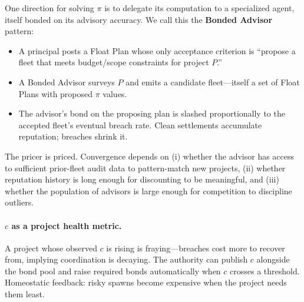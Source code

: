 \documentclass[11pt,a4paper]{article}
\theoremstyle{definition}
\theoremstyle{remark}
\begin{document}
One direction for solving $\pi$ is to delegate its computation to a specialized agent, itself bonded on its advisory accuracy. We call this the \textbf{Bonded Advisor} pattern:
\begin{itemize}[nosep]
  \item A principal posts a Float Plan whose only acceptance criterion is ``propose a fleet that meets budget/scope constraints for project $P$.''
  \item A Bonded Advisor surveys $P$ and emits a candidate fleet---itself a set of Float Plans with proposed $\pi$ values.
  \item The advisor's bond on the proposing plan is slashed proportionally to the accepted fleet's eventual breach rate. Clean settlements accumulate reputation; breaches shrink it.
\end{itemize}

The pricer is priced. Convergence depends on (i) whether the advisor has access to sufficient prior-fleet audit data to pattern-match new projects, (ii) whether reputation history is long enough for discounting to be meaningful, and (iii) whether the population of advisors is large enough for competition to discipline outliers.

\paragraph{$c$ as a project health metric.} A project whose observed $c$ is rising is fraying---breaches cost more to recover from, implying coordination is decaying. The authority can publish $c$ alongside the bond pool and raise required bonds automatically when $c$ crosses a threshold. Homeostatic feedback: risky spawns become expensive when the project needs them least.
\end{document}
